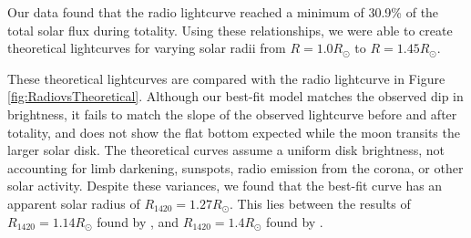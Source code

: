 Our data found that the radio lightcurve reached a minimum of 30.9\% of the total solar flux during totality.
Using these relationships, we were able to create theoretical lightcurves for varying solar radii from $R = 1.0 R_{\odot}$ to $R = 1.45 R_{\odot}$.

These theoretical lightcurves are compared with the radio lightcurve in Figure \ref{fig:RadiovsTheoretical}.
Although our best-fit model matches the observed dip in brightness, it fails to match the slope of the observed lightcurve before and after totality, and does not show the flat bottom expected while the moon transits the larger solar disk.
The theoretical curves assume a uniform disk brightness, not accounting for limb darkening, sunspots, radio emission from the corona, or other solar activity.
Despite these variances, we found that the best-fit curve has an apparent solar radius of $R_{\mathrm{1420}} = 1.27 R_{\odot}$.
This lies between the results of $R_{\mathrm{1420}} = 1.14 R_{\odot}$ found by \cite{messerotti_radio_2000}, and $R_{\mathrm{1420}} = 1.4 R_{\odot}$ found by \cite{leung_solar_2022}.




